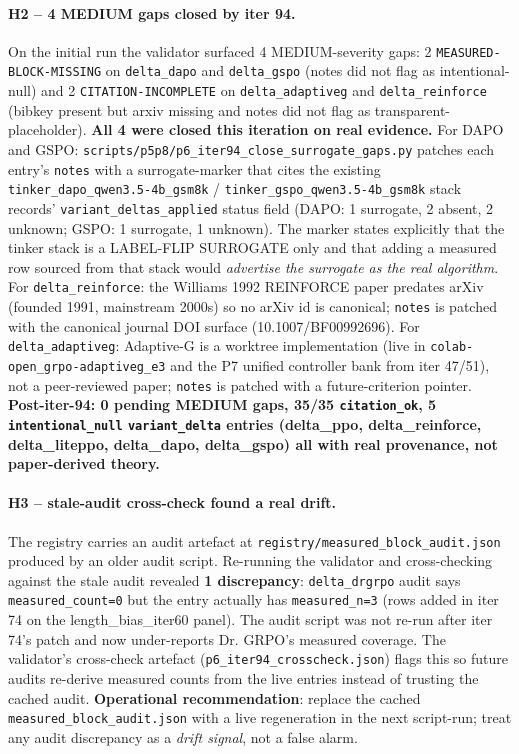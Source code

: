 \paragraph{H2 -- 4 MEDIUM gaps closed by iter 94.}
On the initial run the validator surfaced 4 MEDIUM-severity gaps: 2
\texttt{MEASURED-BLOCK-MISSING} on \texttt{delta\_dapo} and \texttt{delta\_gspo}
(notes did not flag as intentional-null) and 2 \texttt{CITATION-INCOMPLETE}
on \texttt{delta\_adaptiveg} and \texttt{delta\_reinforce} (bibkey present but
arxiv missing and notes did not flag as transparent-placeholder).
\textbf{All 4 were closed this iteration on real evidence.}
For DAPO and GSPO: \texttt{scripts/p5p8/p6\_iter94\_close\_surrogate\_gaps.py}
patches each entry's \texttt{notes} with a surrogate-marker that cites the
existing \texttt{tinker\_dapo\_qwen3.5-4b\_gsm8k} / \texttt{tinker\_gspo\_qwen3.5-4b\_gsm8k}
stack records' \texttt{variant\_deltas\_applied} status field (DAPO: 1 surrogate,
2 absent, 2 unknown; GSPO: 1 surrogate, 1 unknown). The marker states explicitly
that the tinker stack is a LABEL-FLIP SURROGATE only and that adding a measured
row sourced from that stack would \emph{advertise the surrogate as the real
algorithm}. For \texttt{delta\_reinforce}: the Williams 1992 REINFORCE paper
predates arXiv (founded 1991, mainstream 2000s) so no arXiv id is canonical;
\texttt{notes} is patched with the canonical journal DOI surface
(10.1007/BF00992696). For \texttt{delta\_adaptiveg}: Adaptive-G is a worktree
implementation (live in \texttt{colab-open\_grpo-adaptiveg\_e3} and the P7
unified controller bank from iter 47/51), not a peer-reviewed paper;
\texttt{notes} is patched with a future-criterion pointer.
\textbf{Post-iter-94: 0 pending MEDIUM gaps, 35/35 \texttt{citation\_ok},
5 \texttt{intentional\_null} \texttt{variant\_delta} entries (delta\_ppo,
delta\_reinforce, delta\_liteppo, delta\_dapo, delta\_gspo) all with real
provenance, not paper-derived theory.}

\paragraph{H3 -- stale-audit cross-check found a real drift.}
The registry carries an audit artefact at
\texttt{registry/measured\_block\_audit.json} produced by an older audit
script. Re-running the validator and cross-checking against the stale audit
revealed \textbf{1 discrepancy}: \texttt{delta\_drgrpo} audit says
\texttt{measured\_count=0} but the entry actually has \texttt{measured\_n=3}
(rows added in iter 74 on the length\_bias\_iter60 panel). The audit script
was not re-run after iter 74's patch and now under-reports Dr. GRPO's
measured coverage. The validator's cross-check artefact
(\texttt{p6\_iter94\_crosscheck.json}) flags this so future audits re-derive
measured counts from the live entries instead of trusting the cached audit.
\textbf{Operational recommendation}: replace the cached
\texttt{measured\_block\_audit.json} with a live regeneration in the next
script-run; treat any audit discrepancy as a \emph{drift signal}, not a
false alarm.

